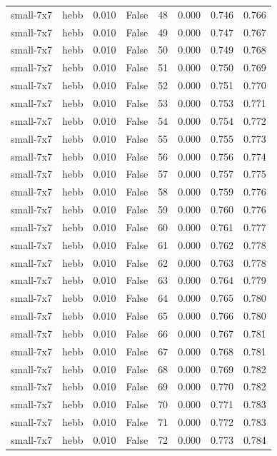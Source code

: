 \begin{tabular}{llrrrrrr}
small-7x7 & hebb & 0.010 & False & 48 & 0.000 & 0.746 & 0.766 \\
small-7x7 & hebb & 0.010 & False & 49 & 0.000 & 0.747 & 0.767 \\
small-7x7 & hebb & 0.010 & False & 50 & 0.000 & 0.749 & 0.768 \\
small-7x7 & hebb & 0.010 & False & 51 & 0.000 & 0.750 & 0.769 \\
small-7x7 & hebb & 0.010 & False & 52 & 0.000 & 0.751 & 0.770 \\
small-7x7 & hebb & 0.010 & False & 53 & 0.000 & 0.753 & 0.771 \\
small-7x7 & hebb & 0.010 & False & 54 & 0.000 & 0.754 & 0.772 \\
small-7x7 & hebb & 0.010 & False & 55 & 0.000 & 0.755 & 0.773 \\
small-7x7 & hebb & 0.010 & False & 56 & 0.000 & 0.756 & 0.774 \\
small-7x7 & hebb & 0.010 & False & 57 & 0.000 & 0.757 & 0.775 \\
small-7x7 & hebb & 0.010 & False & 58 & 0.000 & 0.759 & 0.776 \\
small-7x7 & hebb & 0.010 & False & 59 & 0.000 & 0.760 & 0.776 \\
small-7x7 & hebb & 0.010 & False & 60 & 0.000 & 0.761 & 0.777 \\
small-7x7 & hebb & 0.010 & False & 61 & 0.000 & 0.762 & 0.778 \\
small-7x7 & hebb & 0.010 & False & 62 & 0.000 & 0.763 & 0.778 \\
small-7x7 & hebb & 0.010 & False & 63 & 0.000 & 0.764 & 0.779 \\
small-7x7 & hebb & 0.010 & False & 64 & 0.000 & 0.765 & 0.780 \\
small-7x7 & hebb & 0.010 & False & 65 & 0.000 & 0.766 & 0.780 \\
small-7x7 & hebb & 0.010 & False & 66 & 0.000 & 0.767 & 0.781 \\
small-7x7 & hebb & 0.010 & False & 67 & 0.000 & 0.768 & 0.781 \\
small-7x7 & hebb & 0.010 & False & 68 & 0.000 & 0.769 & 0.782 \\
small-7x7 & hebb & 0.010 & False & 69 & 0.000 & 0.770 & 0.782 \\
small-7x7 & hebb & 0.010 & False & 70 & 0.000 & 0.771 & 0.783 \\
small-7x7 & hebb & 0.010 & False & 71 & 0.000 & 0.772 & 0.783 \\
small-7x7 & hebb & 0.010 & False & 72 & 0.000 & 0.773 & 0.784 \\

\end{tabular}
